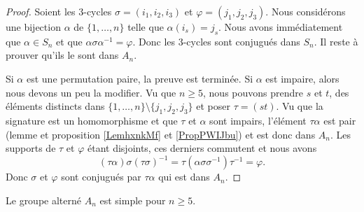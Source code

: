 \begin{proof}
    Soient les \( 3\)-cycles \( \sigma=(i_1,i_2,i_3)\) et \( \varphi=(j_1,j_2,j_3)\). Nous considérons une bijection \( \alpha\) de \( \{ 1,\ldots, n \}\) telle que \( \alpha(i_s)=j_s\). Nous avons immédiatement que \( \alpha\in S_n\) et que \( \alpha\sigma\alpha^{-1}=\varphi\). Donc les \( 3\)-cycles sont conjugués dans \( S_n\). Il reste à prouver qu'ils le sont dans \( A_n\).

    Si \( \alpha\) est une permutation paire, la preuve est terminée. Si \( \alpha\) est impaire, alors nous devons un peu la modifier. Vu que \( n\geq 5\), nous pouvons prendre \( s\) et \( t\), des éléments distincts dans \( \{ 1,\ldots, n \}\setminus\{ j_1,j_2,j_3 \}\) et poser \( \tau=(st)\). Vu que la signature est un homomorphisme et que \( \tau\) et \( \alpha\) sont impairs, l'élément \( \tau\alpha\) est pair (lemme et proposition \ref{LemhxnkMf} et \ref{PropPWIJbu}) et est donc dans \( A_n\). Les supports de \( \tau\) et \( \varphi\) étant disjoints, ces derniers commutent et nous avons
    \begin{equation}
        (\tau\alpha)\sigma(\tau\sigma)^{-1}=\tau(\alpha\sigma\sigma^{-1})\tau^{-1}=\varphi.
    \end{equation}
    Donc \( \sigma\) et \( \varphi\) sont conjugués par \( \tau\alpha\) qui est dans \( A_n\).
\end{proof}

\begin{theorem}
    Le groupe alterné \( A_n\) est simple pour \( n\geq 5\).
\end{theorem}


